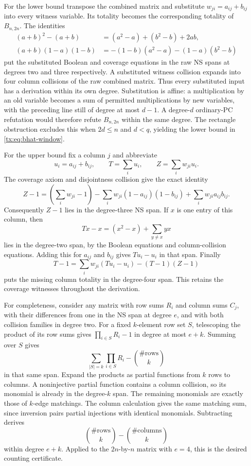 For the lower bound transpose the combined matrix and substitute
$w_{ji}=a_{ij}+b_{ij}$ into every witness variable. Its totality becomes
the corresponding totality of $B_{n,2n}$. The identities
\begin{align*}
(a+b)^2-(a+b)&=(a^2-a)+(b^2-b)+2ab,\\
(a+b)(1-a)(1-b)&=-(1-b)(a^2-a)-(1-a)(b^2-b)
\end{align*}
put the substituted Boolean and coverage equations in the raw NS spans
at degrees two and three respectively. A substituted witness collision
expands into four column collisions of the raw combined matrix.
Thus every substituted input has a derivation within its own degree.
Substitution is affine: a multiplication by an old variable becomes a
sum of permitted multiplications by new variables, with the preceding
line still of degree at most $d-1$. A degree-$d$ ordinary-PC refutation
would therefore refute $B_{n,2n}$ within the same degree. The rectangle
obstruction excludes this when $2d\le n$ and $d<q$, yielding the lower
bound in \eqref{tx:eq:bhat-window}.

For the upper bound fix a column $j$ and abbreviate
\[
 u_i=a_{ij}+b_{ij},\qquad T=\sum_i u_i,\qquad
 Z=\sum_i w_{ji}u_i.
\]
The coverage axiom and disjointness collision give the exact identity
\[
 Z-1=(\sum_iw_{ji}-1)
 -\sum_iw_{ji}(1-a_{ij})(1-b_{ij})
 +\sum_iw_{ji}a_{ij}b_{ij}.
\]
Consequently $Z-1$ lies in the degree-three NS span. If $x$ is one entry
of this column, then
\[
 Tx-x=(x^2-x)+\sum_{y\ne x}yx
\]
lies in the degree-two span, by the Boolean equations and column-collision equations.
Adding this for $a_{ij}$ and $b_{ij}$ gives $Tu_i-u_i$ in that span.
Finally
\[
 T-1=\sum_iw_{ji}(Tu_i-u_i)-(T-1)(Z-1)
\]
puts the missing column totality in the degree-four span. This retains
the coverage witnesses throughout the derivation.

For completeness, consider any matrix with row sums $R_i$ and column
sums $C_j$, with their differences from one in the NS span at degree
$e$, and with both collision families in degree two. For a fixed
$k$-element row set $S$, telescoping the product of its row sums gives
$\prod_{i\in S}R_i-1$ in degree at most $e+k$. Summing over $S$ gives
\[
 \sum_{|S|=k}\prod_{i\in S}R_i-\binom{\#\mathrm{rows}}k
\]
in that same span. Expand the products as partial functions from $k$
rows to columns. A noninjective partial function contains a column
collision, so its monomial is already in the degree-$k$ span.
The remaining monomials are exactly those of $k$-edge matchings.
The column calculation gives the same matching sum, since inversion
pairs partial injections with identical monomials. Subtracting derives
\[
 \binom{\#\mathrm{rows}}k-\binom{\#\mathrm{columns}}k
\]
within degree $e+k$. Applied to the $2n$-by-$n$ matrix with $e=4$, this
is the desired counting certificate.

